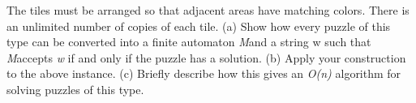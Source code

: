 \documentclass{knittingpattern}
\begin{document}
\vspace{0.5cm}

The tiles must be arranged so that adjacent areas have matching colors. There is an
unlimited number of copies of each tile.
\vspace{0.1cm}\flushleft
(a) Show how every puzzle of this type can be converted into a finite automaton \textit{M}and a string w such that \textit{M}accepts \textit{w} if and only if the puzzle has a solution.
\flushleft
(b) Apply your construction to the above instance.
\vspace{0.1cm}\flushleft
(c) Briefly describe how this gives an \textit{O(n)} algorithm for solving puzzles of this
type. \\
\end{document}
